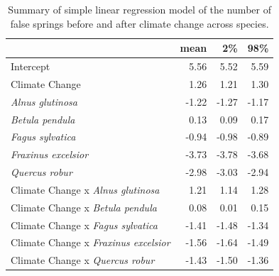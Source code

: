 \documentclass{article}\usepackage[]{graphicx}\usepackage[]{color}
\begin{document}
\begin{table}[H]
\centering
\caption{Summary of simple linear regression model of the number of false springs before and after climate change across species.} 
\label{tab:simpfs}
\begin{tabular}{lrrr}
  \hline
 & mean & 2\% & 98\% \\ 
  \hline
Intercept & 5.56 & 5.52 & 5.59 \\ 
  Climate Change & 1.26 & 1.21 & 1.30 \\ 
  \textit{Alnus glutinosa} & -1.22 & -1.27 & -1.17 \\ 
  \textit{Betula pendula} & 0.13 & 0.09 & 0.17 \\ 
  \textit{Fagus sylvatica} & -0.94 & -0.98 & -0.89 \\ 
  \textit{Fraxinus excelsior} & -3.73 & -3.78 & -3.68 \\ 
  \textit{Quercus robur} & -2.98 & -3.03 & -2.94 \\ 
  Climate Change x \textit{Alnus glutinosa} & 1.21 & 1.14 & 1.28 \\ 
  Climate Change x \textit{Betula pendula} & 0.08 & 0.01 & 0.15 \\ 
  Climate Change x \textit{Fagus sylvatica} & -1.41 & -1.48 & -1.34 \\ 
  Climate Change x \textit{Fraxinus excelsior} & -1.56 & -1.64 & -1.49 \\ 
  Climate Change x \textit{Quercus robur} & -1.43 & -1.50 & -1.36 \\ 
   \hline
\end{tabular}
\end{table}
\end{document}
